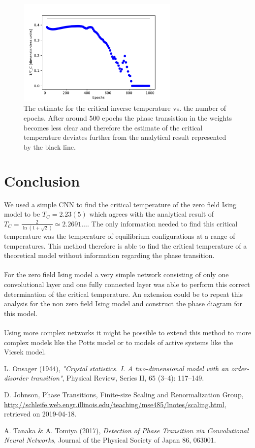 \documentclass[10 pt, a4paper]{article}
\begin{document}
\begin{figure}[H] 
\centering
\includegraphics[width=0.7\textwidth]{epochs}
\caption{The estimate for the critical inverse temperature vs. the number of epochs. After around 500 epochs the phase transistion in the weights becomes less clear and therefore the estimate of the critical temperature deviates further from the analytical result represented by the black line. \label{fig:epochs}}
\end{figure}

\section{Conclusion}

We used a simple CNN to find the critical temperature of the zero field Ising model to be $T_C = 2.23(5)$ which agrees with the analytical result of $T_C = \frac{2}{\ln(1 + \sqrt{2})} \simeq 2.2691 \dots$. The only information needed to find this critical temperature was the temperature of equilibrium configurations at a range of temperatures. This method therefore is able to find the critical temperature of a theoretical model without information regarding the phase transition.
\\
\\
For the zero field Ising model a very simple network consisting of only one convolutional layer and one fully connected layer was able to perform this correct determination of the critical temperature. An extension could be to repeat this analysis for the non zero field Ising model and construct the phase diagram for this model.
\\
\\
Using more complex networks it might be possible to extend this method to more complex models like the Potts model or to models of active systems like the Vicsek model.

\begin{thebibliography}{99}

L. Onsager (1944), \textit{"Crystal statistics. I. A two-dimensional model with an order-disorder transition"}, Physical Review, Series II, 65 (3–4): 117–149.

D. Johnson, Phase Transitions, Finite-size Scaling and Renormalization Group, \url{http://schleife.web.engr.illinois.edu/teaching/mse485/lnotes/scaling.html}, retrieved on 2019-04-18.

A. Tanaka \& A. Tomiya (2017), \textit{Detection of Phase Transition via Convolutional Neural Networks}, Journal of the Physical Society of Japan 86, 063001.
\end{thebibliography}
\end{document}
